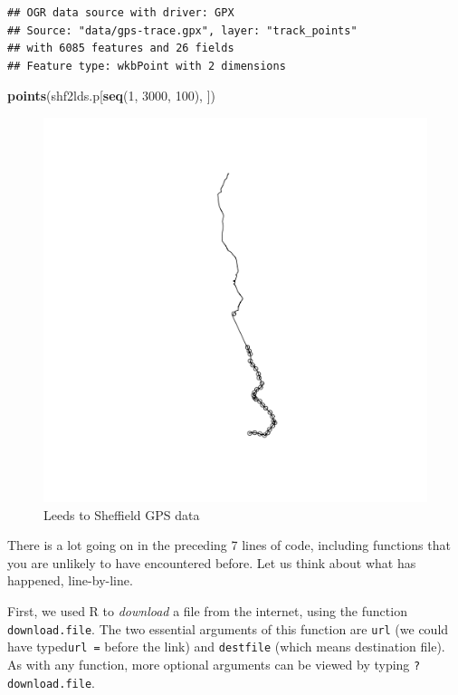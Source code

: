 \documentclass[]{article}
\makeatletter
\newenvironment{Shaded}{}{}
\newcommand{\KeywordTok}[1]{\textcolor[rgb]{0.00,0.44,0.13}{\textbf{{#1}}}}
\newcommand{\DecValTok}[1]{\textcolor[rgb]{0.25,0.63,0.44}{{#1}}}
\newcommand{\NormalTok}[1]{{#1}}
\def\maxwidth{\ifdim\Gin@nat@width>\linewidth\linewidth
\else\Gin@nat@width\fi}
\let\Oldincludegraphics\includegraphics
\renewcommand{\includegraphics}[1]{\Oldincludegraphics[width=\maxwidth]{#1}}
\makeatother
\begin{document}
\begin{verbatim}
## OGR data source with driver: GPX 
## Source: "data/gps-trace.gpx", layer: "track_points"
## with 6085 features and 26 fields
## Feature type: wkbPoint with 2 dimensions
\end{verbatim}

\begin{Shaded}
\begin{Highlighting}[]
\KeywordTok{points}\NormalTok{(shf2lds.p[}\KeywordTok{seq}\NormalTok{(}\DecValTok{1}\NormalTok{, }\DecValTok{3000}\NormalTok{, }\DecValTok{100}\NormalTok{), ])}
\end{Highlighting}
\end{Shaded}

\begin{figure}[htbp]
\centering
\includegraphics{figure/Leeds_to_Sheffield_GPS_data.png}
\caption{Leeds to Sheffield GPS data}
\end{figure}

There is a lot going on in the preceding 7 lines of code, including
functions that you are unlikely to have encountered before. Let us think
about what has happened, line-by-line.

First, we used R to \emph{download} a file from the internet, using the
function \texttt{download.file}. The two essential arguments of this
function are \texttt{url} (we could have typed\texttt{url =} before the
link) and \texttt{destfile} (which means destination file). As with any
function, more optional arguments can be viewed by typing
\texttt{?download.file}.
\end{document}

